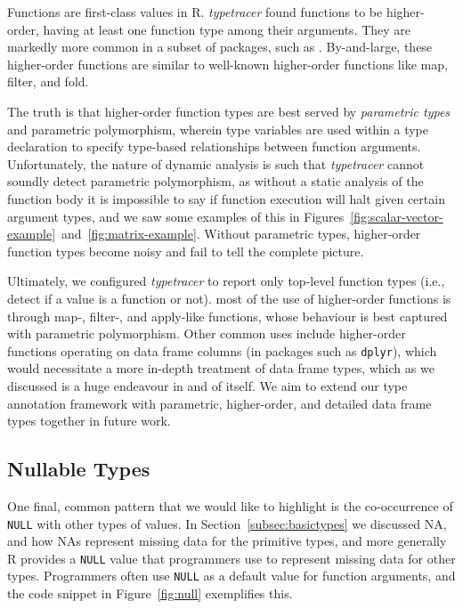 \documentclass[acmsmall,review,anonymous]{acmart}\settopmatter{printfolios=true,printccs=false,printacmref=false}
\newcommand{\code}[1]{{\lstinline[style=Rin]!#1!}\xspace}
\newcommand{\typetracer}{\emph{typetracer}\xspace} %
\begin{document}
Functions are first-class values in R.
\typetracer found  functions to be higher-order, having at least one function type among their arguments.
They are markedly more common in a subset of packages, such as .
By-and-large, these higher-order functions are similar to well-known higher-order functions like map, filter, and fold.

The truth is that higher-order function types are best served by {\it parametric types} and parametric polymorphism, wherein type variables are used within a type declaration to specify type-based relationships between function arguments.
Unfortunately, the nature of dynamic analysis is such that \typetracer cannot soundly detect parametric polymorphism, as without a static analysis of the function body it is impossible to say if function execution will halt given certain argument types, and we saw some examples of this in Figures~\ref{fig:scalar-vector-example}~and~\ref{fig:matrix-example}.
Without parametric types, higher-order function types become noisy and fail to tell the complete picture.

Ultimately, we configured \typetracer to report only top-level function types (i.e., detect if a value is a function or not).
 most of the use of higher-order functions is through map-, filter-, and apply-like functions, whose behaviour is best captured with parametric polymorphism.
Other common uses include higher-order functions operating on data frame columns (in packages such as \code{dplyr}), which would necessitate a more in-depth treatment of data frame types, which as we discussed is a huge endeavour in and of itself.
We aim to extend our type annotation framework with parametric, higher-order, and detailed data frame types together in future work.


%
%
%
%
\subsection{Nullable Types}

One final, common pattern that we would like to highlight is the co-occurrence of \code{NULL} with other types of values.
In Section~\ref{subsec:basictypes} we discussed NA, and how NAs represent missing data for the primitive types, and more generally R provides a \code{NULL} value that programmers use to represent missing data for other types.
Programmers often use \code{NULL} as a default value for function arguments, and the code snippet in Figure~\ref{fig:null} exemplifies this.
\end{document}
